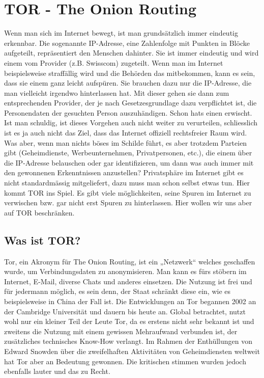 \section{TOR - The Onion Routing}
Wenn man sich im Internet bewegt, ist man grundsätzlich immer eindeutig erkennbar. Die sogenannte IP-Adresse, eine Zahlenfolge mit Punkten in Blöcke aufgeteilt, repräsentiert den Menschen dahinter. Sie ist immer eindeutig und wird einem vom Provider (z.B. Swisscom) zugeteilt. Wenn man im Internet beispielsweise straffällig wird und die Behörden das mitbekommen, kann es sein, dass sie einem ganz leicht aufspüren. Sie brauchen dazu nur die IP-Adresse, die man vielleicht irgendwo hinterlassen hat. Mit dieser gehen sie dann zum entsprechenden Provider, der je nach Gesetzesgrundlage dazu verpflichtet ist, die Personendaten der gesuchten Person auszuhändigen. Schon hats einen erwischt. Ist man schuldig, ist dieses Vorgehen auch nicht weiter zu verurteilen, schliesslich ist es ja auch nicht das Ziel, dass das Internet offiziell rechtsfreier Raum wird. Was aber, wenn man nichts böses im Schilde führt, es aber trotzdem Parteien gibt (Geheimdienste, Werbeunternehmen, Privatpersonen, etc.), die einem über die IP-Adresse belauschen oder gar identifizieren, um dann was auch immer mit den gewonnenen Erkenntnissen anzustellen? Privatsphäre im Internet gibt es nicht standardmässig mitgeliefert, dazu muss man schon selbst etwas tun. Hier kommt TOR ins Spiel. Es gibt viele möglichkeiten, seine Spuren im Internet zu verwischen bzw. gar nicht erst Spuren zu hinterlassen. Hier wollen wir uns aber auf TOR beschränken.

\subsection{Was ist TOR?}
Tor, ein Akronym für The Onion Routing, ist ein „Netzwerk“ welches geschaffen wurde, um Verbindungsdaten zu anonymisieren. Man kann es fürs stöbern im Internet, E-Mail, diverse Chats und anderes einsetzen. Die Nutzung ist frei und für jedermann möglich, es sein denn, der Staat schränkt diese ein, wie es beispielsweise in China der Fall ist. Die Entwicklungen an Tor begannen 2002 an der Cambridge Universität und dauern bis heute an. Global betrachtet, nutzt wohl nur ein kleiner Teil der Leute Tor, da es erstens nicht sehr bekannt ist und zweitens die Nutzung mit einem gewissen Mehraufwand verbunden ist, der zusätzliches technisches Know-How verlangt. Im Rahmen der Enthüllungen von Edward Snowden über die zweifelhaften Aktivitäten von Geheimdiensten weltweit hat Tor aber an Bedeutung gewonnen. Die kritischen stimmen wurden jedoch ebenfalls lauter und das zu Recht.

